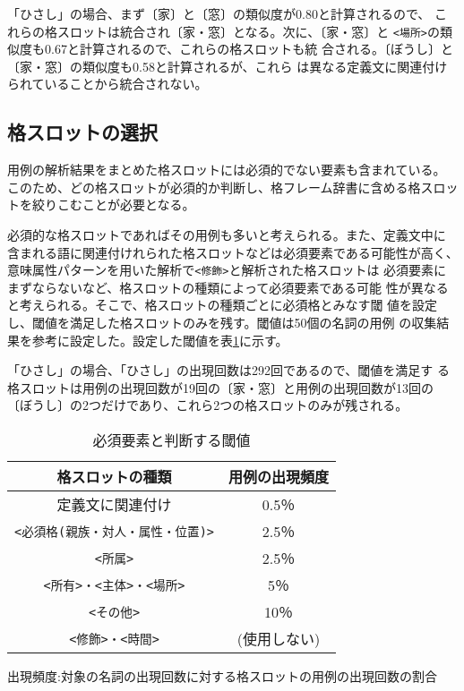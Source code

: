 \documentclass{nlp}
\begin{document}
   「ひさし」の場合、まず〔家〕と〔窓〕の類似度が0.80と計算されるので、
   これらの格スロットは統合され〔家・窓〕となる。次に、〔家・窓〕と
   \texttt{<場所>}の類似度も0.67と計算されるので、これらの格スロットも統
   合される。〔ぼうし〕と〔家・窓〕の類似度も0.58と計算されるが、これら
   は異なる定義文に関連付けられていることから統合されない。

  \subsection{格スロットの選択}
  
  用例の解析結果をまとめた格スロットには必須的でない要素も含まれている。
  このため、どの格スロットが必須的か判断し、格フレーム辞書に含める格スロッ
  トを絞りこむことが必要となる。

  必須的な格スロットであればその用例も多いと考えられる。また、定義文中に
  含まれる語に関連付けれられた格スロットなどは必須要素である可能性が高く、
  意味属性パターンを用いた解析で\texttt{<修飾>}と解析された格スロットは
  必須要素にまずならないなど、格スロットの種類によって必須要素である可能
  性が異なると考えられる。そこで、格スロットの種類ごとに必須格とみなす閾
  値を設定し、閾値を満足した格スロットのみを残す。閾値は50個の名詞の用例
  の収集結果を参考に設定した。設定した閾値を表\ref{thre}に示す。
  
  「ひさし」の場合、「ひさし」の出現回数は292回であるので、閾値を満足す
  る格スロットは用例の出現回数が19回の〔家・窓〕と用例の出現回数が13回の
  〔ぼうし〕の2つだけであり、これら2つの格スロットのみが残される。

  \begin{table}[h]
   \small{
   \caption{必須要素と判断する閾値}
       \label{thre}
   \begin{center}
    \begin{tabular}{cc}\hline
     格スロットの種類 & 用例の出現頻度\\\hline
     定義文に関連付け & 0.5％\\
     \texttt{<必須格(親族・対人・属性・位置)>} & 2.5％\\
     \texttt{<所属>} & 2.5％\\
     \texttt{<所有>・<主体>・<場所>} & 5％\\
     \texttt{<その他>} & 10％\\
     \texttt{<修飾>・<時間>} & (使用しない)\\\hline
    \end{tabular}
   \end{center} 
  \scriptsize{\vspace{-1.5ex}\hspace{10.7em}
   出現頻度:対象の名詞の出現回数に対する格スロットの用例の出現回数の割合}
   }
  \end{table}    
 
\end{document}
